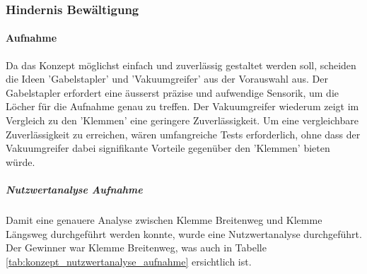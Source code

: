         
    \newpage
    \subsubsection{Hindernis Bewältigung}
        \paragraph{Aufnahme}
            Da das Konzept möglichst einfach und zuverlässig gestaltet werden soll, scheiden die Ideen 'Gabelstapler' und 'Vakuumgreifer' aus der Vorauswahl aus. Der Gabelstapler erfordert eine äusserst präzise und aufwendige Sensorik, um die Löcher für die Aufnahme genau zu treffen. Der Vakuumgreifer wiederum zeigt im Vergleich zu den 'Klemmen' eine geringere Zuverlässigkeit. Um eine vergleichbare Zuverlässigkeit zu erreichen, wären umfangreiche Tests erforderlich, ohne dass der Vakuumgreifer dabei signifikante Vorteile gegenüber den 'Klemmen' bieten würde.

        \subparagraph{Nutzwertanalyse Aufnahme}
        Damit eine genauere Analyse zwischen Klemme Breitenweg und Klemme Längsweg durchgeführt werden konnte, wurde eine Nutzwertanalyse durchgeführt. Der Gewinner war Klemme Breitenweg, was auch in Tabelle \ref{tab:konzept_nutzwertanalyse_aufnahme} ersichtlich ist.
        
